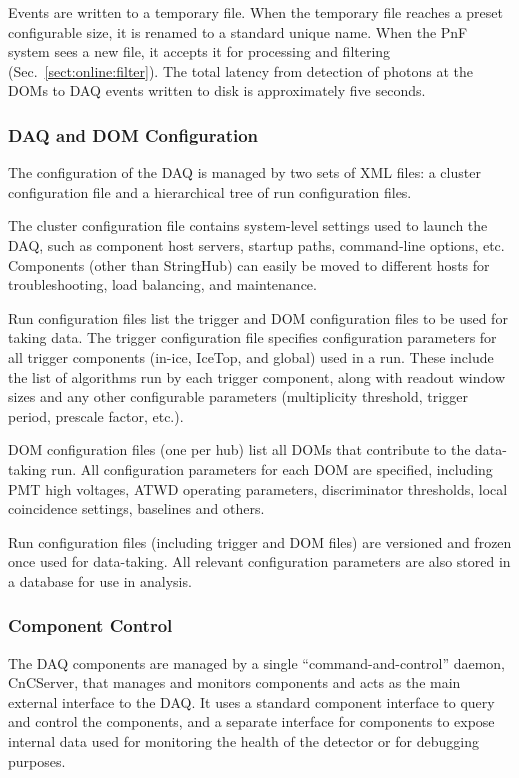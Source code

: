 Events are written to a temporary file.  When the temporary file
reaches a preset configurable size, it is renamed to a standard unique name.  When the PnF
system sees a new file, it accepts it for processing and filtering
(Sec.~\ref{sect:online:filter}).  The total latency from detection of
photons at the DOMs to DAQ events written to disk is approximately five
seconds. 

\subsubsection{\label{sect:online:daqdomconfig}DAQ and DOM Configuration}

The configuration of the DAQ is managed by two sets of XML files: a cluster
configuration file and a hierarchical tree of run configuration files.

The cluster configuration file contains system-level settings used to
launch the DAQ, such as component host servers, startup paths, command-line
options, etc.  Components (other than StringHub) can easily be moved to
different hosts for troubleshooting, load balancing, and maintenance.

Run configuration files list the trigger and DOM configuration files to be
used for taking data.  The trigger configuration file specifies
configuration parameters for all 
trigger components (in-ice, IceTop, and global) used in a run.  These
include the list of algorithms run by each trigger component, along with
readout window sizes and any other configurable parameters (multiplicity
threshold, trigger period, prescale factor, etc.).

DOM configuration files (one per hub) list all DOMs that contribute to
the data-taking run.  All configuration parameters for each DOM are
specified, including PMT high voltages, ATWD operating parameters,
discriminator thresholds, local coincidence settings, baselines and others.

Run configuration files (including trigger and DOM files) are versioned and
frozen once used for data-taking.  All relevant configuration parameters
are also stored in a database for use in analysis.

\subsubsection{Component Control}

The DAQ components are managed by a single ``command-and-control'' daemon,
CnCServer, that manages and monitors components and acts as the main
external interface to the DAQ.  It uses a standard component interface to query and
control the components, and a separate interface for components to expose
internal data used for monitoring the health of the detector or for
debugging purposes.

